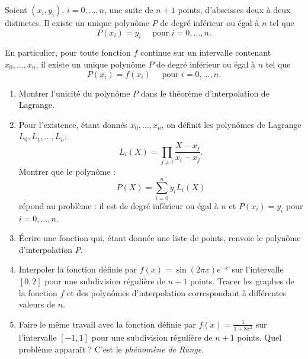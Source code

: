 \documentclass[class=report,crop=false]{standalone}
\begin{document}
\begin{theoreme}
Soient $(x_i,y_i)$, $i=0,\ldots,n$, une suite de $n+1$ points, d'abscisses deux à deux distinctes. 
Il existe un unique polynôme $P$ de degré inférieur ou égal à $n$ tel que
$$P(x_i)=y_i \quad \text{ pour } i=0,\ldots,n.$$
\end{theoreme}

En particulier, pour toute fonction $f$ continue sur un intervalle contenant $x_0,\ldots,x_n$, 
il existe un unique polynôme $P$ de degré inférieur ou égal à $n$ tel que
$$P(x_i)=f(x_i) \quad \text{ pour } i=0,\ldots,n.$$


\begin{tp}
\sauteligne
\begin{enumerate}
  \item Montrer l'unicité du polynôme $P$ dans le théorème d'interpolation de Lagrange. 
  
  \item Pour l'existence, étant donnés $x_0,\ldots, x_n$, on définit les polynômes de Lagrange $L_0,L_1,\ldots,L_n$:
  $$L_i(X) = \prod_{j \neq i} \frac{X-x_j}{x_i-x_j}.$$
  Montrer que le polynôme :
  $$P(X) = \sum_{i=0}^{n} y_i L_i(X)$$
  répond au problème : il est de degré inférieur ou égal à $n$ et $P(x_i)=y_i$  pour $i=0,\ldots,n$.
    
  \item \'Ecrire une fonction qui, étant donnée une liste de points, renvoie le polynôme
  d'interpolation $P$.
  
  \item Interpoler la fonction définie par $f(x) = \sin(2\pi x)e^{-x}$
  sur l'intervalle $[0,2]$ pour une subdivision régulière de $n+1$ points.
  Tracer les graphes de la fonction $f$ et des polynômes d'interpolation
  correspondant à différentes valeurs de $n$.
  
  \item Faire le même travail avec la fonction définie par $f(x) = \frac{1}{1+8x^2}$
  sur l'intervalle $[-1,1]$ pour une subdivision régulière de $n+1$ points.
  Quel problème apparaît ? C'est le \emph{phénomène de Runge}.
\end{enumerate}
\end{tp}
\end{document}
